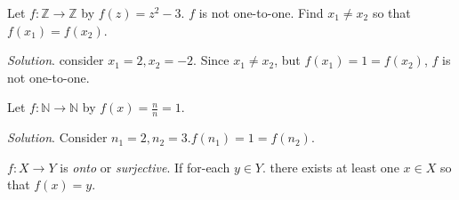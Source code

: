\documentclass{article}
\newenvironment{solution}{\textit{Solution}.}
\newcommand{\proofseparator}{\par\noindent\rule{\textwidth}{0.4pt}}
\newcommand{\N}{\ensuremath{\mathbb{N}}}
\newcommand{\Z}{\ensuremath{\mathbb{Z}}}
\begin{document}
        \begin{example}
            Let $f\colon \Z \rightarrow \Z$ by $f(z) = z^2 - 3$. $f$ is not one-to-one. Find $x_1 \ne x_2$ so that $f(x_1) = f(x_2)$. 
        \end{example}

        \begin{solution}
            consider $x_1 = 2, x_2 = -2$. Since $x_1 \ne x_2$, but $f(x_1) = 1 = f(x_2)$, $f$ is not one-to-one.
        \end{solution}

        \proofseparator

        \vspace{0.5cm}

        \begin{example}
            Let $f\colon \N \rightarrow \N$ by $f(x) = \frac{n}{n} = 1$.
        \end{example}

        \begin{solution}
            Consider $n_1 = 2, n_2 = 3. f(n_1) = 1 = f(n_2)$.
        \end{solution}

        \proofseparator

        \begin{definition}
            $f\colon X\rightarrow Y$ is \textit{onto} or \textit{surjective}. If for-each $y\in Y$. there exists at least one $x\in X$ so that $f(x) = y$.
        \end{definition}

        \vspace{0.5cm}
\end{document}
